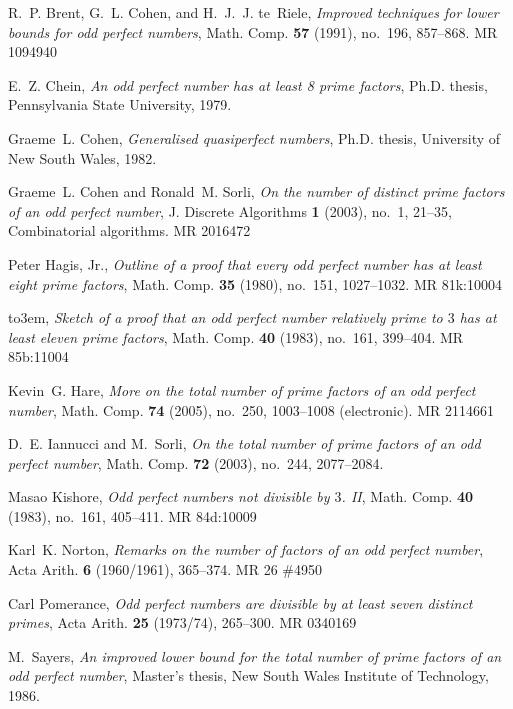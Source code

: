 \documentclass{article}
\begin{document}
%
%

\providecommand{\bysame}{\leavevmode\hbox to3em{\hrulefill}\thinspace}
\providecommand{\MR}{\relax\ifhmode\unskip\space\fi MR }
\providecommand{\MRhref}[2]{%
  \href{http://www.ams.org/mathscinet-getitem?mr=#1}{#2}
}
\providecommand{\href}[2]{#2}
\begin{thebibliography}{10}

R.~P. Brent, G.~L. Cohen, and H.~J.~J. te~Riele, \emph{Improved techniques for
  lower bounds for odd perfect numbers}, Math. Comp. \textbf{57} (1991),
  no.~196, 857--868. \MR{1094940}

E.~Z. Chein, \emph{An odd perfect number has at least 8 prime factors}, Ph.D.
  thesis, Pennsylvania State University, 1979.

Graeme~L. Cohen, \emph{Generalised quasiperfect numbers}, Ph.D. thesis,
  University of New South Wales, 1982.

Graeme~L. Cohen and Ronald~M. Sorli, \emph{On the number of distinct prime
  factors of an odd perfect number}, J. Discrete Algorithms \textbf{1} (2003),
  no.~1, 21--35, Combinatorial algorithms. \MR{2016472}

Peter Hagis, Jr., \emph{Outline of a proof that every odd perfect number has at
  least eight prime factors}, Math. Comp. \textbf{35} (1980), no.~151,
  1027--1032. \MR{81k:10004}

\bysame, \emph{Sketch of a proof that an odd perfect number relatively prime to
  {$3$} has at least eleven prime factors}, Math. Comp. \textbf{40} (1983),
  no.~161, 399--404. \MR{85b:11004}

Kevin~G. Hare, \emph{More on the total number of prime factors of an odd
  perfect number}, Math. Comp. \textbf{74} (2005), no.~250, 1003--1008
  (electronic). \MR{2114661}

D.~E. Iannucci and M.~Sorli, \emph{On the total number of prime factors of an
  odd perfect number}, Math. Comp. \textbf{72} (2003), no.~244, 2077--2084.

Masao Kishore, \emph{Odd perfect numbers not divisible by {$3$}. {II}}, Math.
  Comp. \textbf{40} (1983), no.~161, 405--411. \MR{84d:10009}

Karl~K. Norton, \emph{Remarks on the number of factors of an odd perfect
  number}, Acta Arith. \textbf{6} (1960/1961), 365--374. \MR{26 \#4950}

Carl Pomerance, \emph{Odd perfect numbers are divisible by at least seven
  distinct primes}, Acta Arith. \textbf{25} (1973/74), 265--300.
  \MR{0340169}

M.~Sayers, \emph{An improved lower bound for the total number of prime factors
  of an odd perfect number}, Master's thesis, New South Wales Institute of
  Technology, 1986.

\end{thebibliography}
\end{document}
